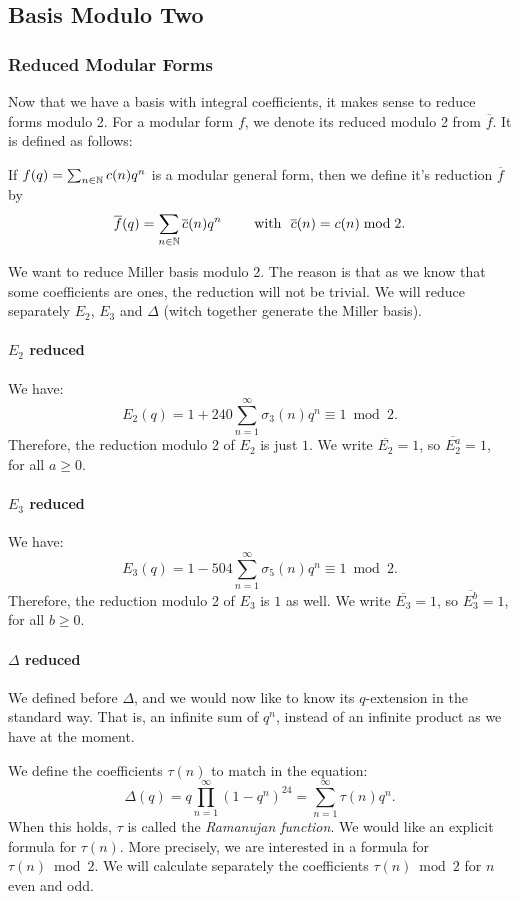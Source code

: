 \subsection{Basis Modulo Two}
\subsubsection{Reduced Modular Forms}
Now that we have a basis with integral coefficients, it makes sense to reduce forms modulo 2.
For a modular form $f$, we denote its reduced modulo 2 from $\overline{f}$. It is defined as follows:

If $f(q) = \sum_{n \in \mathbb{N}} c(n)q^n$ is a modular general form, then we define it's reduction $\overline{f}$ by
$$
\overline{f}(q) = \sum_{n \in \mathbb{N}} \overline{c}(n)q^n 
\qquad \text{ with } \ \overline{c}(n) = c(n) \bmod 2 .
$$

We want to reduce Miller basis modulo 2.
The reason is that as we know that some coefficients are ones, the reduction will not be trivial.
We will reduce separately $E_2$, $E_3$ and $\Delta$ (witch together generate the Miller basis).

\paragraph{$E_2$ reduced}
We have:
$$
E_2(q) = 1 + 240 \sum_{n=1}^{\infty} \sigma_{3}(n)q^n \equiv 1 \bmod 2.
$$
Therefore, the reduction modulo 2 of $E_2$ is just $1$.
We write $\overline{E_2} = 1$, so $\overline{E_2^a} = 1$, for all $a \geq 0$.

\paragraph{$E_3$ reduced}
We have:
$$
E_3(q) = 1 - 504 \sum_{n=1}^{\infty} \sigma_{5}(n)q^n \equiv 1 \bmod 2.
$$
Therefore, the reduction modulo 2 of $E_3$ is $1$ as well.
We write $\overline{E_3} = 1$, so $\overline{E_3^b} = 1$, for all $b \geq 0$.

\paragraph{$\Delta$ reduced}
We defined before $\Delta$, and we would now like to know its $q$-extension in the standard way.
That is, an infinite sum of $q^n$, instead of an infinite product as we have at the moment.

We define the coefficients $\tau(n)$ to match in the equation: 
$$
\Delta(q) 
= q \prod_{n=1}^{\infty} (1-q^n)^{24} 
= \sum_{n=1}^{\infty} \tau(n)q^n.
$$
When this holds, $\tau$ is called the \textit{Ramanujan function}.
We would like an explicit formula for $\tau(n)$. More precisely, we are interested in a formula for $\tau(n) \bmod 2$.
We will calculate separately the coefficients $\tau(n) \bmod 2$ for $n$ even and odd.

